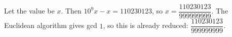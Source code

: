 Let the value be $x$. Then $10^9x-x=110230123$, so $x=\dfrac{110230123}{999999999}$. The Euclidean algorithm gives gcd $1$, so this is already reduced: $\boxed{\dfrac{110230123}{999999999}}$.
